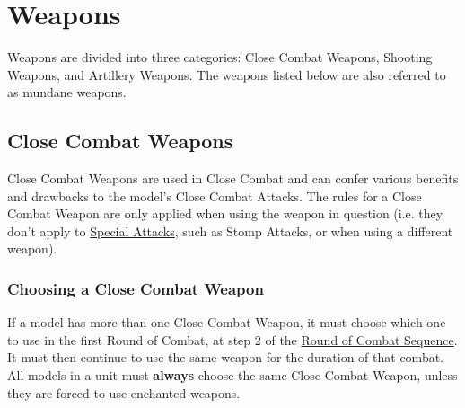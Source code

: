 \newpage
\section{Weapons}
\label{weapons}

Weapons are divided into three categories: Close Combat Weapons, Shooting Weapons, and Artillery Weapons. The weapons listed below are also referred to as mundane weapons.

\subsection{Close Combat Weapons}
\label{close_combat_weapons}

Close Combat Weapons are used in Close Combat and can confer various benefits and drawbacks to the model's Close Combat Attacks. The rules for a Close Combat Weapon are only applied when using the weapon in question (i.e. they don't apply to \hyperref[special_attacks]{Special Attacks}, such as Stomp Attacks, or when using a different weapon).

\subsubsection{Choosing a Close Combat Weapon}

If a model has more than one Close Combat Weapon, it must choose which one to use in the first Round of Combat, at step 2 of the \hyperref[round_of_combat_sequence]{Round of Combat Sequence}. It must then continue to use the same weapon for the duration of that combat. All \rnf{} models in a unit must \textbf{always} choose the same Close Combat Weapon, unless they are forced to use enchanted weapons.

